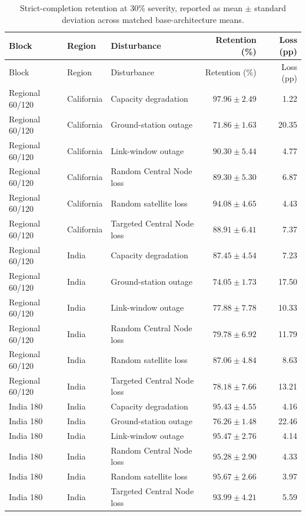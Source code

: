 \begin{longtable}{L{0.16\textwidth}L{0.13\textwidth}L{0.31\textwidth}rr}
\caption{Strict-completion retention at 30\% severity, reported as mean $\pm$ standard deviation across matched base-architecture means.}\label{tab:appendix_robustness_mean_sd}\\
\toprule
Block & Region & Disturbance & Retention (\%) & Loss (pp) \\
\midrule
\endfirsthead
\toprule
Block & Region & Disturbance & Retention (\%) & Loss (pp) \\
\midrule
\endhead
Regional 60/120 & California & Capacity degradation & $97.96\pm2.49$ & 1.22 \\
Regional 60/120 & California & Ground-station outage & $71.86\pm1.63$ & 20.35 \\
Regional 60/120 & California & Link-window outage & $90.30\pm5.44$ & 4.77 \\
Regional 60/120 & California & Random Central Node loss & $89.30\pm5.30$ & 6.87 \\
Regional 60/120 & California & Random satellite loss & $94.08\pm4.65$ & 4.43 \\
Regional 60/120 & California & Targeted Central Node loss & $88.91\pm6.41$ & 7.37 \\
Regional 60/120 & India & Capacity degradation & $87.45\pm4.54$ & 7.23 \\
Regional 60/120 & India & Ground-station outage & $74.05\pm1.73$ & 17.50 \\
Regional 60/120 & India & Link-window outage & $77.88\pm7.78$ & 10.33 \\
Regional 60/120 & India & Random Central Node loss & $79.78\pm6.92$ & 11.79 \\
Regional 60/120 & India & Random satellite loss & $87.06\pm4.84$ & 8.63 \\
Regional 60/120 & India & Targeted Central Node loss & $78.18\pm7.66$ & 13.21 \\
India 180 & India & Capacity degradation & $95.43\pm4.55$ & 4.16 \\
India 180 & India & Ground-station outage & $76.26\pm1.48$ & 22.46 \\
India 180 & India & Link-window outage & $95.47\pm2.76$ & 4.14 \\
India 180 & India & Random Central Node loss & $95.28\pm2.90$ & 4.33 \\
India 180 & India & Random satellite loss & $95.67\pm2.66$ & 3.97 \\
India 180 & India & Targeted Central Node loss & $93.99\pm4.21$ & 5.59 \\
\bottomrule
\end{longtable}

